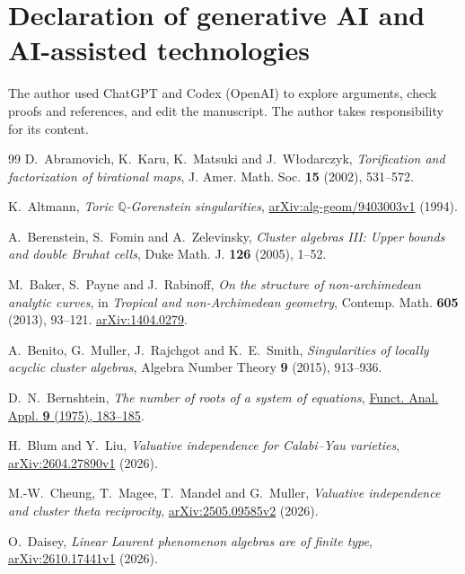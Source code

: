 \documentclass[11pt,reqno]{amsart}
\numberwithin{equation}{section}
\theoremstyle{definition}
\theoremstyle{remark}
\begin{document}
\section*{Declaration of generative AI and AI-assisted technologies}

The author used ChatGPT and Codex (OpenAI) to explore arguments, check proofs
and references, and edit the manuscript. The author takes responsibility for its content.

\enlargethispage{2\baselineskip}

\begin{thebibliography}{99}
D.~Abramovich, K.~Karu, K.~Matsuki and J.~W{\l}odarczyk,
\emph{Torification and factorization of birational maps},
J. Amer. Math. Soc. \textbf{15} (2002), 531--572.

K.~Altmann, \emph{Toric \(\mathbb Q\)-Gorenstein singularities},
\href{https://arxiv.org/abs/alg-geom/9403003v1}{arXiv:alg-geom/9403003v1} (1994).

A.~Berenstein, S.~Fomin and A.~Zelevinsky, \emph{Cluster algebras III:
Upper bounds and double Bruhat cells},
Duke Math. J. \textbf{126} (2005), 1--52.

M.~Baker, S.~Payne and J.~Rabinoff, \emph{On the structure of non-archimedean analytic curves},
in \emph{Tropical and non-Archimedean geometry}, Contemp. Math. \textbf{605} (2013),
93--121. \href{https://arxiv.org/abs/1404.0279}{arXiv:1404.0279}.

A.~Benito, G.~Muller, J.~Rajchgot and K.~E.~Smith,
\emph{Singularities of locally acyclic cluster algebras},
Algebra Number Theory \textbf{9} (2015), 913--936.

D.~N.~Bernshtein, \emph{The number of roots of a system of equations},
\href{https://doi.org/10.1007/BF01075595}{Funct. Anal. Appl. \textbf{9} (1975), 183--185}.

H.~Blum and Y.~Liu, \emph{Valuative independence for Calabi--Yau varieties},
\href{https://arxiv.org/abs/2604.27890v1}{arXiv:2604.27890v1} (2026).

M.-W.~Cheung, T.~Magee, T.~Mandel and G.~Muller,
\emph{Valuative independence and cluster theta reciprocity},
\href{https://arxiv.org/abs/2505.09585v2}{arXiv:2505.09585v2} (2026).

O.~Daisey, \emph{Linear Laurent phenomenon algebras are of finite type},
\href{https://arxiv.org/abs/2610.17441v1}{arXiv:2610.17441v1} (2026).


\end{thebibliography}
\end{document}
